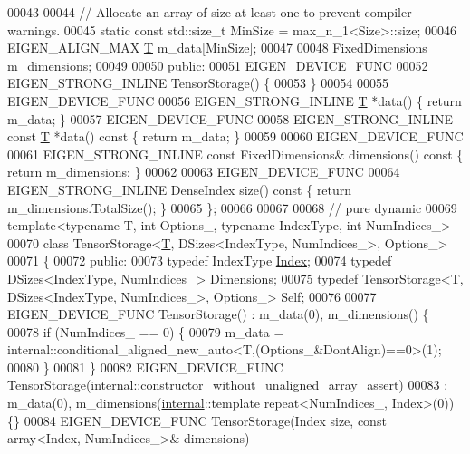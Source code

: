 \begin{DoxyCode}
00043 
00044   \textcolor{comment}{// Allocate an array of size at least one to prevent compiler warnings.}
00045   \textcolor{keyword}{static} \textcolor{keyword}{const} std::size\_t MinSize = max\_n\_1<Size>::size;
00046   EIGEN\_ALIGN\_MAX \hyperlink{group___sparse_core___module_class_eigen_1_1_triplet}{T} m\_data[MinSize];
00047 
00048   FixedDimensions m\_dimensions;
00049 
00050  \textcolor{keyword}{public}:
00051   EIGEN\_DEVICE\_FUNC
00052   EIGEN\_STRONG\_INLINE TensorStorage() \{
00053   \}
00054 
00055   EIGEN\_DEVICE\_FUNC
00056   EIGEN\_STRONG\_INLINE \hyperlink{group___sparse_core___module_class_eigen_1_1_triplet}{T} *data() \{ \textcolor{keywordflow}{return} m\_data; \}
00057   EIGEN\_DEVICE\_FUNC
00058   EIGEN\_STRONG\_INLINE \textcolor{keyword}{const} \hyperlink{group___sparse_core___module_class_eigen_1_1_triplet}{T} *data()\textcolor{keyword}{ const }\{ \textcolor{keywordflow}{return} m\_data; \}
00059 
00060   EIGEN\_DEVICE\_FUNC
00061   EIGEN\_STRONG\_INLINE \textcolor{keyword}{const} FixedDimensions& dimensions()\textcolor{keyword}{ const }\{ \textcolor{keywordflow}{return} m\_dimensions; \}
00062 
00063   EIGEN\_DEVICE\_FUNC
00064   EIGEN\_STRONG\_INLINE DenseIndex size()\textcolor{keyword}{ const }\{ \textcolor{keywordflow}{return} m\_dimensions.TotalSize(); \}
00065 \};
00066 
00067 
00068 \textcolor{comment}{// pure dynamic}
00069 \textcolor{keyword}{template}<\textcolor{keyword}{typename} T, \textcolor{keywordtype}{int} Options\_, \textcolor{keyword}{typename} IndexType, \textcolor{keywordtype}{int} NumIndices\_>
00070 \textcolor{keyword}{class }TensorStorage<\hyperlink{group___sparse_core___module_class_eigen_1_1_triplet}{T}, DSizes<IndexType, NumIndices\_>, Options\_>
00071 \{
00072   \textcolor{keyword}{public}:
00073     \textcolor{keyword}{typedef} IndexType \hyperlink{namespace_eigen_a62e77e0933482dafde8fe197d9a2cfde}{Index};
00074     \textcolor{keyword}{typedef} DSizes<IndexType, NumIndices\_> Dimensions;
00075     \textcolor{keyword}{typedef} TensorStorage<T, DSizes<IndexType, NumIndices\_>, Options\_> Self;
00076 
00077     EIGEN\_DEVICE\_FUNC TensorStorage() : m\_data(0), m\_dimensions() \{
00078       \textcolor{keywordflow}{if} (NumIndices\_ == 0) \{
00079     m\_data = internal::conditional\_aligned\_new\_auto<T,(Options\_&DontAlign)==0>(1);
00080       \}
00081     \}
00082     EIGEN\_DEVICE\_FUNC TensorStorage(internal::constructor\_without\_unaligned\_array\_assert)
00083       : m\_data(0), m\_dimensions(\hyperlink{namespaceinternal}{internal}::template repeat<NumIndices\_, Index>(0)) \{\}
00084     EIGEN\_DEVICE\_FUNC TensorStorage(Index size, \textcolor{keyword}{const} array<Index, NumIndices\_>& dimensions)

\end{DoxyCode}
